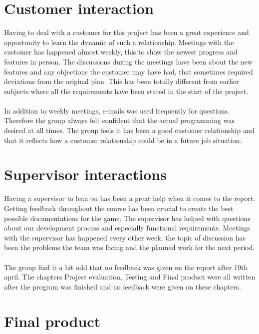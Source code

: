\section{Customer interaction}

Having to deal with a customer for this project has been a great experience and opportunity to learn the dynamic of such a relationship. Meetings with the customer has happened almost weekly, this to show the newest progress and features in person. The discussions during the meetings have been about the new features and any objections the customer may have had, that sometimes required deviations from the original plan. This has been totally different from earlier subjects where all the requirements have been stated in the start of the project. \\
\\
In addition to weekly meetings, e-mails was used frequently for questions. Therefore the group always felt confident that the actual programming was desired at all times. The group feels it has been a good customer relationship and that it reflects how a customer relationship could be in a future job situation.   

\section{Supervisor interactions}
Having a supervisor to lean on has been a great help when it comes to the report. Getting feedback throughout the course has been crucial to create the best possible documentations for the game. The supervisor has helped with questions about our development process and especially functional requirements. Meetings with the supervisor has happened every other week, the topic of discussion has been the problems the team was facing and the planned work for the next period. \\
\\
The group find it a bit odd that no feedback was given on the report after 19th april. The chapters Project evaluation, Testing and Final product were all written after the program was finished and no feedback were given on these chapters.

\section{Final product}


